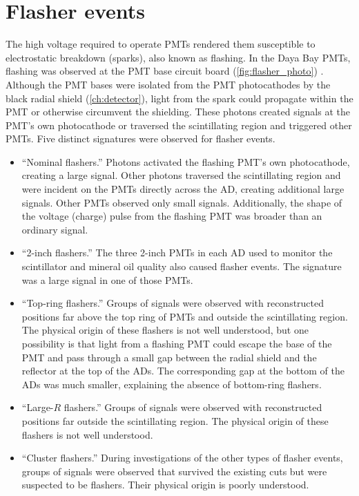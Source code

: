 \section{Flasher events}
\label{sec:flashers}

The high voltage required to operate PMTs rendered them susceptible
to electrostatic breakdown (sparks), also known as flashing.
In the Daya Bay PMTs, flashing was observed
at the PMT base circuit board (\cref{fig:flasher_photo}) \cite{flasherphotos_docdb}.
Although the PMT bases were isolated from the
PMT photocathodes by the black radial shield (\cref{ch:detector}),
light from the spark could propagate within the PMT
or otherwise circumvent the shielding.
These photons created signals at the PMT's own photocathode
or traversed the scintillating region and triggered other PMTs.
Five distinct signatures were observed for flasher events.
\begin{itemize}
    \item ``Nominal flashers.'' Photons activated the flashing PMT's own photocathode,
        creating a large signal.
        Other photons traversed the scintillating region and were incident
        on the PMTs directly across the AD, creating additional large signals.
        Other PMTs observed only small signals.
        Additionally, the shape of the voltage (charge) pulse from the
        flashing PMT was broader than an ordinary signal.
    \item ``2-inch flashers.'' The three 2-inch PMTs in each AD
        used to monitor the scintillator and mineral oil quality also caused flasher events.
        The signature was a large signal in one of those PMTs.
    \item ``Top-ring flashers.'' Groups of signals were observed
        with reconstructed positions far above the top ring of PMTs
        and outside the scintillating region.
        The physical origin of these flashers is not well understood,
        but one possibility is that light from a flashing PMT
        could escape the base of the PMT
        and pass through a small gap between the radial shield
        and the reflector at the top of the ADs.
        The corresponding gap at the bottom of the ADs was much smaller,
        explaining the absence of bottom-ring flashers.
    \item ``Large-$R$ flashers.'' Groups of signals were observed
        with reconstructed positions far outside the scintillating region.
        The physical origin of these flashers is not well understood.
    \item ``Cluster flashers.''
        During investigations of the other types of flasher events,
        groups of signals were observed that survived the existing cuts
        but were suspected to be flashers.
        Their physical origin is poorly understood.
\end{itemize}

